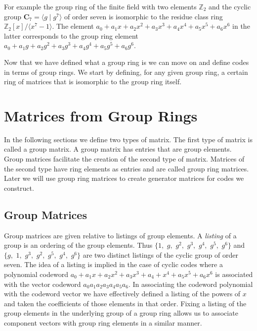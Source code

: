 For example the group ring of the finite field with two elements $\mathbb{Z}_2$ and the cyclic group $\mathbf{C}_7 = \langle g \mid g^7\rangle$ of order seven is isomorphic to the residue class ring $\mathbb{Z}_2[x] / \langle x^7 - 1 \rangle$.
The element $a_0 + a_1 x + a_2 x^2 + a_3 x^3 + a_4 x^4 + a_5 x^5 + a_6 x^6$ in the latter corresponds to the group ring element $a_0 + a_1 g + a_2 g^2 + a_3 g^3 + a_4 g^4 + a_5 g^5 + a_6 g^6$.

Now that we have defined what a group ring is we can move on and define codes in terms of group rings.
We start by defining, for any given group ring, a certain ring of matrices that is isomorphic to the group ring itself.

\section{Matrices from Group Rings}
In the following sections we define two types of matrix.
The first type of matrix is called a group matrix.
A group matrix has entries that are group elements.
Group matrices facilitate the creation of the second type of matrix.
Matrices of the second type have ring elements as entries and are called group ring matrices.
Later we will use group ring matrices to create generator matrices for codes we construct.

\subsection{Group Matrices}
Group matrices are given relative to listings of group elements.
A \emph{listing} of a group is an ordering of the group elements.
Thus $\{1,$ $g,$ $g^2,$ $g^3,$ $g^4,$ $g^5,$ $g^6\}$ and $\{g,$ $1,$ $g^3,$ $g^2,$ $g^5,$ $g^4,$ $g^6\}$ are two distinct listings of the cyclic group of order seven.
The idea of a listing is implied in the case of cyclic codes where a polynomial codeword $a_0 + a_1 x + a_2 x^2 + a_3 x^3 + a_4 + x^4 + a_5 x^5 + a_6 x^6$ is associated with the vector codeword $a_0 a_1 a_2 a_3 a_4 a_5 a_6$.
In associating the codeword polynomial with the codeword vector we have effectively defined a listing of the powers of $x$ and taken the coefficients of those elements in that order.
Fixing a listing of the group elements in the underlying group of a group ring allows us to associate component vectors with group ring elements in a similar manner.

